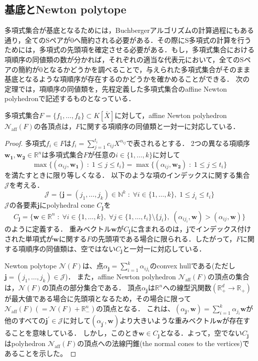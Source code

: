 \subsection{\groebner{}基底とNewton polytope}
多項式集合が\groebner{}基底となるためには，Buchbergerアルゴリズムの計算過程にもある通り，全てのSペアが$0$へ簡約される必要がある．その際にS多項式の計算を行うためには，多項式の先頭項を確定させる必要がある．もし，多項式集合における項順序の同値類の数が分かれば，それぞれの適当な代表元において，全てのSペアの簡約が$0$となるかどうかを調べることで，与えられた多項式集合がそのまま\groebner{}基底となるような項順序が存在するのかどうかを確かめることができる．
次の定理では，項順序の同値類を，先程定義した多項式集合のaffine Newton polyhedronで記述するものとなっている．
\begin{theorem}
	\label{chapter03:theorem:GBD_main_theorem}
	多項式集合$F = \{f_1, \dots, f_k\} \subset K[\bar{X}]$に対して，affine Newton polyhedron $\mathcal{N}_{\mathrm{aff}}(F)$の各頂点は，$F$に関する項順序の同値類と一対一に対応している．
\end{theorem}

\begin{proof}
	多項式$f_i \in F$は$\displaystyle f_i = \sum_{j=1}^{t_i}c_{ij}X^{\alpha_{ij}}$で表されるとする．
	2つの異なる項順序$\bm{w_1}, \bm{w_2} \in \mathbb{R}^n$は多項式集合$F$が任意の$i \in \{1, \dots, k\}$に対して
	$$\max \{(\alpha_{ij}, \bm{w_1}) \; : \; 1 \le j \le t_i\} = \max \{(\alpha_{ij}, \bm{w_2}) \; : \; 1 \le j \le t_i\}$$
	を満たすときに限り等しくなる．
	以下のような項のインデックスに関する集合$\mathcal{J}$を考える．
	$$\mathcal{J} = \{ \bm{j} = (j_1, \dots, j_k) \in \mathbb{N}^k \;:\; \forall i \in \{1, \dots, k\}, \; 1 \le j_i \le t_i\}$$
	$\mathcal{J}$の各要素$\bm{j}$にpolyhedral cone $C_{\bm{j}}$を
	$$C_{\bm{j}} = \{\bm{w} \in \mathbb{R}^n \;:\; \forall i \in \{1, \dots, k\}, \; \forall j \in \{1, \dots, t_i\} \setminus \{j_i\}, \; (\alpha_{ij_i}, \bm{w}) > (\alpha_{ij}, \bm{w}) \}$$
	のように定義する．
	重みベクトル$\bm{w}$が$C_{\bm{j}}$に含まれるのは，$\bm{j}$でインデックス付けされた単項式が$\bm{w}$に関する$F$の先頭項である場合に限られる．したがって，$F$に関する項順序の同値類は、空ではない$C_{\bm{j}}$と一対一に対応している．
	\par
	Newton polytope $\mathcal{N}(F)$は、点$\displaystyle \alpha_{\bm{j}} = \sum^k_{i=1} \alpha_{ij_i}$のconvex hullである(ただし$\bm{j} = (j_1, \dots, j_k) \in \mathcal{J}$)．
	また，affine Newton polyhedron $\mathcal{N}_{\mathrm{aff}}(F)$の頂点の集合は，$\mathcal{N}(F)$の頂点の部分集合である．
	頂点$\alpha_{\bm{j}}$は$\mathbb{R}^n$への線型汎関数$(\mathbb{R}_{+}^d \to \mathbb{R}_+)$が最大値である場合に先頭項となるため，その場合に限って$\mathcal{N}_{\mathrm{aff}}(F) (= \mathcal{N}(F) + \mathbb{R}_{-}^n)$の頂点となる．
	これは、$\displaystyle (\alpha_{\bm{j}}, \bm{w}) = \sum_{i = 1}^k \alpha_{j_i}\bm{w}$が他のすべての$\bm{j}^\prime \in \mathcal{J}$に対して$(\alpha_{\bm{j}^\prime}, \bm{w})$より大きいような重みベクトル$\bm{w}$が存在することを意味している．
	しかし，このとき$\bm{w} \in C_{\bm{j}}$となる．よって，空でない$C_{\bm{j}}$はpolyhedron $\mathcal{N}_{\mathrm{aff}}(F)$の頂点への法線円錐(the normal cones to the vertices)であることを示した。
\end{proof}

